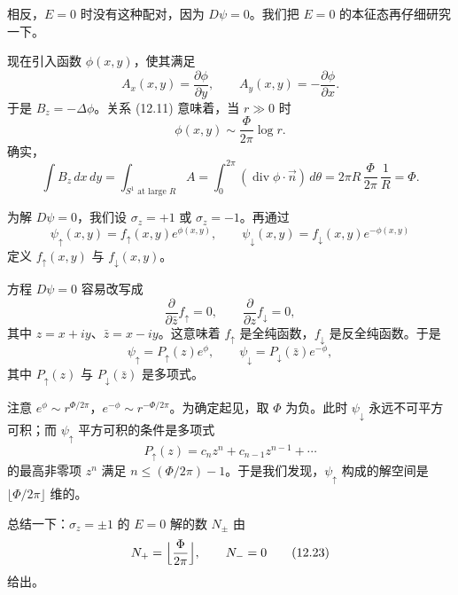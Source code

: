 相反，$E=0$ 时没有这种配对，因为 $D\psi=0$。我们把 $E=0$ 的本征态再仔细研究一下。

现在引入函数 $\phi(x,y)$，使其满足
\begin{equation}
  A_x(x,y)=\frac{\partial\phi}{\partial y},\qquad
  A_y(x,y)=-\frac{\partial\phi}{\partial x}.
  \tag{12.16}
\end{equation}
于是 $B_z=-\Delta\phi$。关系 (12.11) 意味着，当 $r\gg0$ 时
\begin{equation}
  \phi(x,y)\sim\frac{\Phi}{2\pi}\log r .
  \tag{12.17}
\end{equation}
确实，
\begin{equation}
  \int B_z\,dx\,dy=\int_{S^1\text{ at large }R}A
  =\int_0^{2\pi}(\operatorname{div}\phi\cdot\vec n)\,d\theta
  =2\pi R\,\frac{\Phi}{2\pi}\,\frac{1}{R}=\Phi .
  \tag{12.18}
\end{equation}

为解 $D\psi=0$，我们设 $\sigma_z=+1$ 或 $\sigma_z=-1$。再通过
\begin{equation}
  \psi_\uparrow(x,y)=f_\uparrow(x,y)e^{\phi(x,y)},\qquad
  \psi_\downarrow(x,y)=f_\downarrow(x,y)e^{-\phi(x,y)}
  \tag{12.19}
\end{equation}
定义 $f_\uparrow(x,y)$ 与 $f_\downarrow(x,y)$。

方程 $D\psi=0$ 容易改写成
\begin{equation}
  \frac{\partial}{\partial\bar z}f_\uparrow=0,\qquad
  \frac{\partial}{\partial z}f_\downarrow=0,
  \tag{12.20}
\end{equation}
其中 $z=x+iy$、$\bar z=x-iy$。这意味着 $f_\uparrow$ 是全纯函数，$f_\downarrow$ 是反全纯函数。于是
\begin{equation}
  \psi_\uparrow=P_\uparrow(z)e^{\phi},\qquad
  \psi_\downarrow=P_\downarrow(\bar z)e^{-\phi},
  \tag{12.21}
\end{equation}
其中 $P_\uparrow(z)$ 与 $P_\downarrow(\bar z)$ 是多项式。

注意 $e^{\phi}\sim r^{\Phi/2\pi}$，$e^{-\phi}\sim r^{-\Phi/2\pi}$。为确定起见，取 $\Phi$ 为负。此时 $\psi_\downarrow$ 永远不可平方可积；而 $\psi_\uparrow$ 平方可积的条件是多项式
\begin{equation}
  P_\uparrow(z)=c_nz^n+c_{n-1}z^{n-1}+\cdots
  \tag{12.22}
\end{equation}
的最高非零项 $z^n$ 满足 $n\le(\Phi/2\pi)-1$。于是我们发现，$\psi_\uparrow$ 构成的解空间是 $\lfloor\Phi/2\pi\rfloor$ 维的。

总结一下：$\sigma_z=\pm1$ 的 $E=0$ 解的数 $N_\pm$ 由
\begin{equation}
  N_+=\Bigl\lfloor\frac{\Phi}{2\pi}\Bigr\rfloor,\qquad N_-=0
  \tag{12.23}
\end{equation}
给出。

